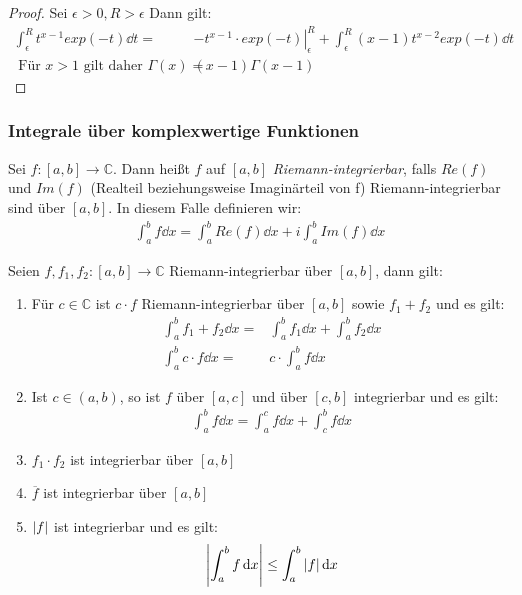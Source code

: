 \begin{proof}
	Sei $\epsilon > 0, R > \epsilon$ Dann gilt:
	\begin{align*}
		\int_{\epsilon}^{R}t^{x-1} exp(-t) \dd{t}  = & 
			\left. -t^{x-1} \cdot exp(-t) \right\vert_{\epsilon}^R 
			+ \int_{\epsilon}^{R}(x-1)t^{x-2}exp(-t) \dd{t} \\
			\text{ Für } x > 1 \text{ gilt daher }
			\Gamma(x) = &  (x-1) \Gamma(x-1)
	\end{align*}
\end{proof}

\subsubsection{Integrale über komplexwertige Funktionen}

\begin{Definition}{
	Sei $f: [a,b] \rightarrow \mathbb{C}$. Dann heißt $f$ auf $[a,b]$ 
	\emph{Riemann-integrierbar}, falls $Re(f)$ und $Im(f)$ (Realteil beziehungsweise 
	Imaginärteil von f) Riemann-integrierbar sind über $[a,b]$. In diesem Falle 
	definieren wir:
	\begin{align*}
		\int_a^b f \dd{x} = \int_a^b Re(f) \dd{x} + i \int_a^b Im(f) \dd{x}
	\end{align*}
}\end{Definition}

\begin{Satz}{
	Seien $f, f_1, f_2: [a,b] \rightarrow \mathbb{C}$ Riemann-integrierbar über 
	$[a,b]$, dann gilt:
	\renewcommand{\labelenumi}{\alph{enumi})}
	\begin{enumerate}
		\item Für $c \in \mathbb{C}$ ist $c \cdot f$ Riemann-integrierbar über 
		$[a,b]$ sowie $f_1 + f_2$ und es gilt:
		\begin{align*}
			\int_a^b f_1 + f_2 \dd{x} = &\int_a^b f_1 \dd{x} + \int_a^b f_2 \dd{x}\\
			\int_a^b c \cdot f \dd{x} = & c \cdot \int_a^b f \dd{x} 
		\end{align*}
		\item Ist $ c \in (a,b)$, so ist $f$ über $[a,c]$ und über $[c,b]$ 
		integrierbar und es gilt:
		\begin{align*}
			\int_a^b f \dd{x} = \int_a^c f \dd{x} + \int_c^b f \dd{x}
		\end{align*}
		\item $f_1 \cdot f_2$ ist integrierbar über $[a,b]$
		\item $\overline{f}$ ist integrierbar über $[a,b]$
		\item $\abs{f}$ ist integrierbar und es gilt:
		\begin{align*}
			\abs{\int_a^b f \dd{x} } \leq \int_a^b \abs{f} \dd{x}
		\end{align*}
	\end{enumerate}
}\end{Satz}

